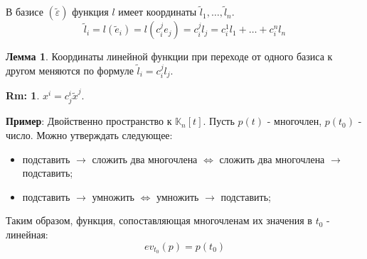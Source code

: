 \documentclass[12pt]{article}
\newcommand{\VE}{\varepsilon}
\theoremstyle{definition}
\newtheorem{rem}{Rm:}
\newtheorem{lemma}{Лемма}
\begin{document}
В базисе $(\tilde{\VE})$ функция $l$ имеет координаты $\tilde{l}_1,\dotsc, \tilde{l}_n$.
$$
	 \tilde{l}_i = l(\tilde{e}_i) = l(c_i^j e_j) = c_i^j l_j = c_i^1 l_1 + \dotsc + c_i^n l_n
$$
\begin{lemma}
	Координаты линейной функции при переходе от одного базиса к другом меняются по формуле $\tilde{l}_i = c_i^jl_j$.
\end{lemma}
\begin{rem}
	$x^i = c_j^i \tilde{x}^j$.
\end{rem}
\textbf{Пример}: Двойственно пространство к $\mathbb{K}_n[t]$. Пусть $p(t)$ - многочлен, $p(t_0)$ - число. Можно утверждать следующее:
\begin{itemize}
	\item подставить $\rightarrow$ сложить два многочлена $\Leftrightarrow$ сложить два многочлена $\rightarrow$ подставить;
	\item подставить $\rightarrow$ умножить  $\Leftrightarrow$ умножить $\rightarrow$ подставить;
\end{itemize}
Таким образом, функция, сопоставляющая многочленам их значения в $t_0$ - линейная:
$$ev_{t_0}(p) = p(t_0)$$
\end{document}
